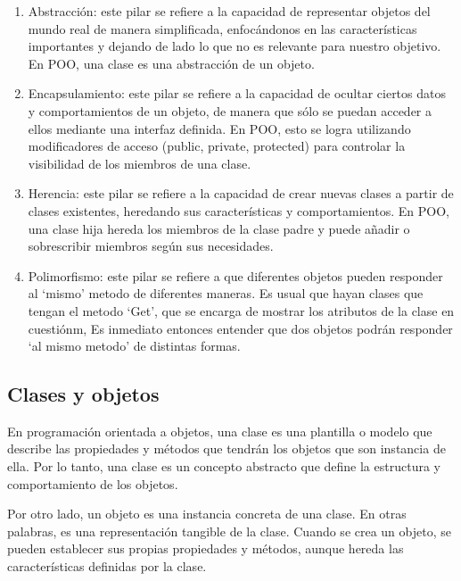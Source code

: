 \documentclass[executivepaper]{article}
\begin{document}
\begin{enumerate}
    \item Abstracción: este pilar se refiere a la capacidad de representar objetos del mundo real de manera simplificada, enfocándonos en las características importantes y dejando de lado lo que no es relevante para nuestro objetivo. En POO, una clase es una abstracción de un objeto.
    \item Encapsulamiento: este pilar se refiere a la capacidad de ocultar ciertos datos y comportamientos de un objeto, de manera que sólo se puedan acceder a ellos mediante una interfaz definida. En POO, esto se logra utilizando modificadores de acceso (public, private, protected) para controlar la visibilidad de los miembros de una clase.
    \item Herencia: este pilar se refiere a la capacidad de crear nuevas clases a partir de clases existentes, heredando sus características y comportamientos. En POO, una clase hija hereda los miembros de la clase padre y puede añadir o sobrescribir miembros según sus necesidades.
    \item Polimorfismo: este pilar se refiere a que diferentes objetos pueden responder al \enquote*{mismo} metodo de diferentes maneras. Es usual que hayan clases que tengan el metodo \enquote*{Get}, que se encarga de mostrar los atributos de la clase en cuestiónm, Es inmediato entonces entender que dos objetos podrán responder \enquote*{al mismo metodo} de distintas formas. 
\end{enumerate}

\subsection{Clases y objetos}

En programación orientada a objetos, una clase es una plantilla o modelo que describe las propiedades y métodos que tendrán los objetos que son instancia de ella. Por lo tanto, una clase es un concepto abstracto que define la estructura y comportamiento de los objetos.

Por otro lado, un objeto es una instancia concreta de una clase. En otras palabras, es una representación tangible de la clase. Cuando se crea un objeto, se pueden establecer sus propias propiedades y métodos, aunque hereda las características definidas por la clase.
\end{document}
